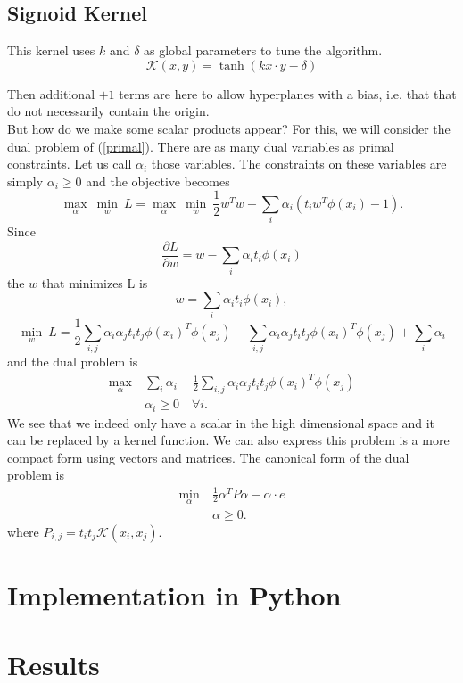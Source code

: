 \documentclass{article}
\begin{document}
\subsection{Signoid Kernel}
This kernel uses $k$ and $\delta$ as global parameters to tune the algorithm.
$$\mathcal{K}(x,y)  = \tanh(k x \cdot y - \delta)$$




Then additional $+1$ terms are here to allow hyperplanes with a bias, i.e. that that do not necessarily contain the origin.\\

But how do we make some scalar products appear? For this, we will consider the dual problem of (\ref{primal}). There are as many dual variables as primal constraints. Let us call $\alpha_i$ those variables. The constraints on these variables are simply $\alpha_i \geq 0$ and the objective becomes
$$\max_{\alpha} \ \min_{w} \ L = \max_{\alpha} \ \min_{w} \ \frac{1}{2} w^Tw - \sum_i \alpha_i (t_iw^T\phi(x_i)-1).$$ 
Since
$$\frac{\partial L}{\partial w} = w - \sum_i \alpha_i t_i \phi(x_i)$$
the $w$ that minimizes L is
$$w = \sum_i \alpha_i t_i \phi(x_i),$$
$$ \min_{w} \ L = \frac{1}{2} \sum_{i,j} \alpha_i \alpha_j t_i t_j \phi(x_i)^T \phi(x_j) - \sum_{i,j} \alpha_i \alpha_j t_i t_j \phi(x_i)^T \phi(x_j) + \sum_i \alpha_i$$
and the dual problem is
 \begin{align*}
\max_{\alpha} \ &\sum_i \alpha_i -  \frac{1}{2} \sum_{i,j} \alpha_i \alpha_j t_i t_j \phi(x_i)^T \phi(x_j)\\
&\alpha_i \geq 0 \quad \forall i  \nonumber.
\end{align*}
We see that we indeed only have a scalar in the high dimensional space and it can be replaced by a kernel function. We can also express this problem is a more compact form using vectors and matrices. The canonical form of the dual problem is 
 \begin{align}
\min_{\alpha} \ & \frac{1}{2} \alpha^T P \alpha - \alpha \cdot e\\
&\alpha \geq 0  \nonumber.
\label{dual}
\end{align}
where $P_{i,j} = t_it_j\mathcal{K}(x_i, x_j)$.


\section{Implementation in Python}



\section{Results}
\newpage
\end{document}
